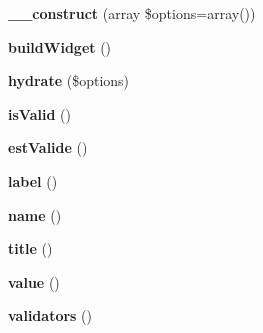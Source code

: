 \begin{DoxyCompactItemize}
\item 
\hypertarget{class_library_1_1_field_a2d2b2afcd896367c740d1eb4b486614b}{{\bfseries \+\_\+\+\_\+construct} (array \$options=array())}\label{class_library_1_1_field_a2d2b2afcd896367c740d1eb4b486614b}

\item 
\hypertarget{class_library_1_1_field_a3724547eb0ec2b00884571328d7e2d5d}{{\bfseries build\+Widget} ()}\label{class_library_1_1_field_a3724547eb0ec2b00884571328d7e2d5d}

\item 
\hypertarget{class_library_1_1_field_a96ae54acd6e17102c5e7742f97a5dbc3}{{\bfseries hydrate} (\$options)}\label{class_library_1_1_field_a96ae54acd6e17102c5e7742f97a5dbc3}

\item 
\hypertarget{class_library_1_1_field_a7b37efab7473a1effc29f8be2421f6e3}{{\bfseries is\+Valid} ()}\label{class_library_1_1_field_a7b37efab7473a1effc29f8be2421f6e3}

\item 
\hypertarget{class_library_1_1_field_ad2696392106fc5da9c1ab0e5f8985531}{{\bfseries est\+Valide} ()}\label{class_library_1_1_field_ad2696392106fc5da9c1ab0e5f8985531}

\item 
\hypertarget{class_library_1_1_field_a020110ce3df34bdff247ee2f23715645}{{\bfseries label} ()}\label{class_library_1_1_field_a020110ce3df34bdff247ee2f23715645}

\item 
\hypertarget{class_library_1_1_field_a4b516aaa5fa38da4fed24ab6001627e2}{{\bfseries name} ()}\label{class_library_1_1_field_a4b516aaa5fa38da4fed24ab6001627e2}

\item 
\hypertarget{class_library_1_1_field_ad264ad0cabbe965bf7f7c8a5ed6abebb}{{\bfseries title} ()}\label{class_library_1_1_field_ad264ad0cabbe965bf7f7c8a5ed6abebb}

\item 
\hypertarget{class_library_1_1_field_aefbfa229f1c9e1fc967bff724a010f9e}{{\bfseries value} ()}\label{class_library_1_1_field_aefbfa229f1c9e1fc967bff724a010f9e}

\item 
\hypertarget{class_library_1_1_field_adfcaa364655f727ed0cb3eba5fe0fa93}{{\bfseries validators} ()}\label{class_library_1_1_field_adfcaa364655f727ed0cb3eba5fe0fa93}


\end{DoxyCompactItemize}
